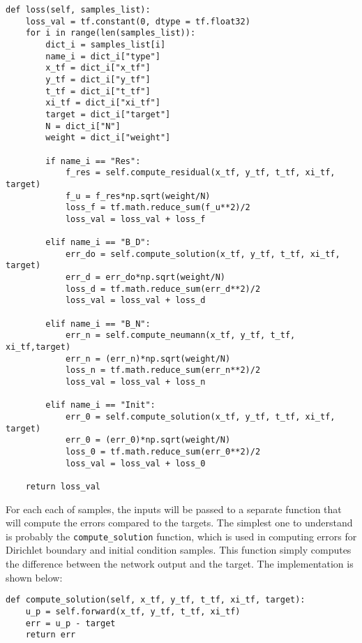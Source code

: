 \documentclass{article}
\begin{document}
\begin{lstlisting}
def loss(self, samples_list):
	loss_val = tf.constant(0, dtype = tf.float32)
	for i in range(len(samples_list)):
		dict_i = samples_list[i]
		name_i = dict_i["type"]
		x_tf = dict_i["x_tf"]
		y_tf = dict_i["y_tf"]
		t_tf = dict_i["t_tf"]
		xi_tf = dict_i["xi_tf"]
		target = dict_i["target"]
		N = dict_i["N"]
		weight = dict_i["weight"]

		if name_i == "Res":
			f_res = self.compute_residual(x_tf, y_tf, t_tf, xi_tf, target)
			f_u = f_res*np.sqrt(weight/N)
			loss_f = tf.math.reduce_sum(f_u**2)/2
			loss_val = loss_val + loss_f

		elif name_i == "B_D":
			err_do = self.compute_solution(x_tf, y_tf, t_tf, xi_tf, target)
			err_d = err_do*np.sqrt(weight/N)
			loss_d = tf.math.reduce_sum(err_d**2)/2
			loss_val = loss_val + loss_d
				
		elif name_i == "B_N":
			err_n = self.compute_neumann(x_tf, y_tf, t_tf, xi_tf,target)
			err_n = (err_n)*np.sqrt(weight/N)
			loss_n = tf.math.reduce_sum(err_n**2)/2
			loss_val = loss_val + loss_n

		elif name_i == "Init":
			err_0 = self.compute_solution(x_tf, y_tf, t_tf, xi_tf, target)
			err_0 = (err_0)*np.sqrt(weight/N)
			loss_0 = tf.math.reduce_sum(err_0**2)/2
			loss_val = loss_val + loss_0

	return loss_val
\end{lstlisting}

For each each of samples, the inputs will be passed to a separate function that will compute the errors compared to the targets. The simplest one to understand is probably the \texttt{compute\_solution} function, which is used in computing errors for Dirichlet boundary and initial condition samples. This function simply computes the difference between the network output and the target. The implementation is shown below:
\begin{lstlisting}
def compute_solution(self, x_tf, y_tf, t_tf, xi_tf, target):
	u_p = self.forward(x_tf, y_tf, t_tf, xi_tf)
	err = u_p - target
	return err
\end{lstlisting}
\end{document}
